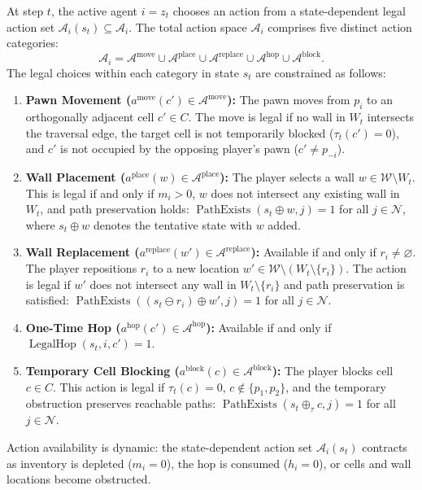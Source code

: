 \documentclass{article}
\begin{document}
At step $t$, the active agent $i = z_t$ chooses an action from a state-dependent legal action set $\mathcal{A}_i(s_t) \subseteq \mathcal{A}_i$. The total action space $\mathcal{A}_i$ comprises five distinct action categories:
\begin{equation}
\mathcal{A}_i = \mathcal{A}^{\text{move}} \cup \mathcal{A}^{\text{place}} \cup \mathcal{A}^{\text{replace}} \cup \mathcal{A}^{\text{hop}} \cup \mathcal{A}^{\text{block}}.
\end{equation}
The legal choices within each category in state $s_t$ are constrained as follows:
\begin{enumerate}
    \item \textbf{Pawn Movement ($a^{\text{move}}(c') \in \mathcal{A}^{\text{move}}$):} The pawn moves from $p_i$ to an orthogonally adjacent cell $c' \in C$. The move is legal if no wall in $W_t$ intersects the traversal edge, the target cell is not temporarily blocked ($\tau_t(c') = 0$), and $c'$ is not occupied by the opposing player's pawn ($c' \ne p_{-i}$).
    \item \textbf{Wall Placement ($a^{\text{place}}(w) \in \mathcal{A}^{\text{place}}$):} The player selects a wall $w \in \mathcal{W} \setminus W_t$. This is legal if and only if $m_i > 0$, $w$ does not intersect any existing wall in $W_t$, and path preservation holds: $\operatorname{PathExists}(s_t \oplus w, j) = 1$ for all $j \in \mathcal{N}$, where $s_t \oplus w$ denotes the tentative state with $w$ added.
    \item \textbf{Wall Replacement ($a^{\text{replace}}(w') \in \mathcal{A}^{\text{replace}}$):} Available if and only if $r_i \ne \varnothing$. The player repositions $r_i$ to a new location $w' \in \mathcal{W} \setminus (W_t \setminus \{r_i\})$. The action is legal if $w'$ does not intersect any wall in $W_t \setminus \{r_i\}$ and path preservation is satisfied: $\operatorname{PathExists}((s_t \ominus r_i) \oplus w', j) = 1$ for all $j \in \mathcal{N}$.
    \item \textbf{One-Time Hop ($a^{\text{hop}}(c') \in \mathcal{A}^{\text{hop}}$):} Available if and only if $\operatorname{LegalHop}(s_t, i, c') = 1$.
    \item \textbf{Temporary Cell Blocking ($a^{\text{block}}(c) \in \mathcal{A}^{\text{block}}$):} The player blocks cell $c \in C$. This action is legal if $\tau_t(c) = 0$, $c \notin \{p_1, p_2\}$, and the temporary obstruction preserves reachable paths: $\operatorname{PathExists}(s_t \oplus_{\tau} c, j) = 1$ for all $j \in \mathcal{N}$.
\end{enumerate}
Action availability is dynamic: the state-dependent action set $\mathcal{A}_i(s_t)$ contracts as inventory is depleted ($m_i = 0$), the hop is consumed ($h_i = 0$), or cells and wall locations become obstructed.
\end{document}
